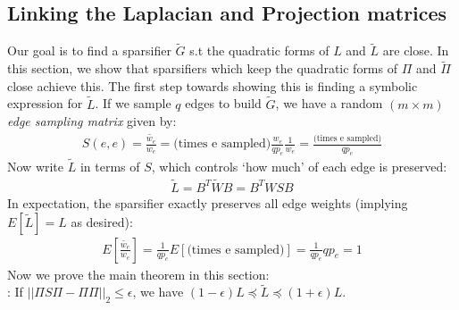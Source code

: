 \documentclass{article}
\begin{document}
\subsection{Linking the Laplacian and Projection matrices}

Our goal is to find a sparsifier $\tilde{G}$ s.t the quadratic forms of $L$
and $\tilde{L}$ are close. In this section, we show that sparsifiers which
keep the quadratic forms of $\Pi$ and $\tilde{\Pi}$ close achieve this. The
first step towards showing this is finding a symbolic expression for
$\tilde{L}$. If we sample $q$ edges to build $\tilde{G}$, we have a random
$(m \times m)$ \textit{edge sampling matrix} given by:
\begin{align*}
    S(e, e) = \frac{\tilde{w_e}}{w_e} = \text{(times e
    sampled)}\frac{w_e}{qp_e}\frac{1}{w_e} = \frac{\text{(times e
    sampled)}}{qp_e}
\end{align*}
Now write $\tilde{L}$ in terms of $S$, which controls `how much' of each
edge is preserved:
\begin{align*}
    \tilde{L} = B^T\tilde{W}B = B^TWSB
\end{align*}
In expectation, the sparsifier exactly preserves all edge weights (implying
$E[\tilde{L}] = L$ as desired):
\begin{align*}
    E\left[\frac{\tilde{w_e}}{w_e}\right] = \frac{1}{qp_e}E[\text{(times e
    sampled)}] = \frac{1}{qp_e}qp_e = 1
\end{align*}
Now we prove the main theorem in this section: \\

\noindent
{}: If $||\Pi S\Pi - \Pi\Pi||_2 \leq
\epsilon$, we have $(1-\epsilon)L \preceq \tilde{L} \preceq (1+\epsilon)L$.
\end{document}
